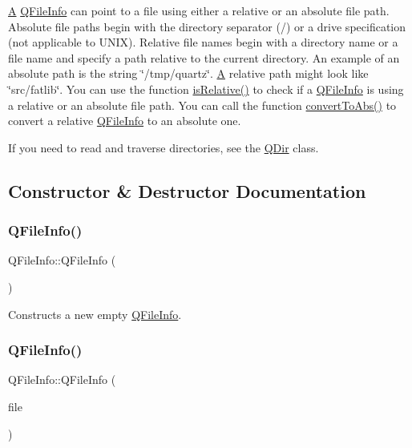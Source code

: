 \mbox{\hyperlink{class_a}{A}} \mbox{\hyperlink{class_q_file_info}{Q\+File\+Info}} can point to a file using either a relative or an absolute file path. Absolute file paths begin with the directory separator (\textquotesingle{}/\textquotesingle{}) or a drive specification (not applicable to U\+N\+IX). Relative file names begin with a directory name or a file name and specify a path relative to the current directory. An example of an absolute path is the string \char`\"{}/tmp/quartz\char`\"{}. \mbox{\hyperlink{class_a}{A}} relative path might look like \char`\"{}src/fatlib\char`\"{}. You can use the function \mbox{\hyperlink{class_q_file_info_ae1b2d0ad6ca05510092d0182e276a5d0}{is\+Relative()}} to check if a \mbox{\hyperlink{class_q_file_info}{Q\+File\+Info}} is using a relative or an absolute file path. You can call the function \mbox{\hyperlink{class_q_file_info_a3a4b0328b3fd423e0cfb0747445760b8}{convert\+To\+Abs()}} to convert a relative \mbox{\hyperlink{class_q_file_info}{Q\+File\+Info}} to an absolute one.

If you need to read and traverse directories, see the \mbox{\hyperlink{class_q_dir}{Q\+Dir}} class. 

\subsection{Constructor \& Destructor Documentation}
\mbox{\label{class_q_file_info_a7cfa76234a4b4c22f071a41452c5f7df}} 
\subsubsection{\texorpdfstring{QFileInfo()}{QFileInfo()}\hspace{0.1cm}{\footnotesize\ttfamily [1/5]}}
{\footnotesize\ttfamily Q\+File\+Info\+::\+Q\+File\+Info (\begin{DoxyParamCaption}{ }\end{DoxyParamCaption})}

Constructs a new empty \mbox{\hyperlink{class_q_file_info}{Q\+File\+Info}}. \mbox{\label{class_q_file_info_a0b6a4788de6ee6c2b66a0841cd212bbe}} 
\subsubsection{\texorpdfstring{QFileInfo()}{QFileInfo()}\hspace{0.1cm}{\footnotesize\ttfamily [2/5]}}
{\footnotesize\ttfamily Q\+File\+Info\+::\+Q\+File\+Info (\begin{DoxyParamCaption}\item[{const \mbox{\hyperlink{class_q_string}{Q\+String}} \&}]{file }\end{DoxyParamCaption})}

